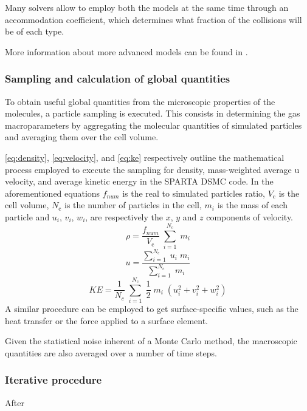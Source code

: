 Many solvers allow to employ both the models at the same time through an accommodation coefficient, which determines what fraction of the collisions will be of each type.

More information about more advanced models can be found in \cite{spartadoc}.

\subsubsection{Sampling and calculation of global quantities}
\label{subsection:sampling}

To obtain useful global quantities from the microscopic properties of the molecules, a particle sampling is executed. This consists in determining the gas macroparameters by aggregating the molecular quantities of simulated particles and averaging them over the cell volume. 

\autoref{eq:density}, \autoref{eq:velocity}, and \autoref{eq:ke} respectively outline the mathematical process employed to execute the sampling for density, mass-weighted average u velocity, and average kinetic energy in the SPARTA DSMC code. In the aforementioned equations $f_{num}$ is the real to simulated particles ratio, $V_{\mathrm{c}}$ is the cell volume, $N_{\mathrm{c}}$ is the number of particles in the cell, $m_i$ is the mass of each particle and $u_i$, $v_i$, $w_i$, are respectively the $x$, $y$ and $z$ components of velocity.
\begin{equation}
    \rho = \frac{f_{num}}{V_{\mathrm{c}}}\; \sum_{i=1}^{N_{\mathrm{c}}}\; m_i
    \label{eq:density}
\end{equation}
\begin{equation}
    u = \frac{\sum_{i=1}^{N_{\mathrm{c}}}\; u_i\; m_i}{\sum_{i=1}^{N_{\mathrm{c}}}\; m_i} 
    \label{eq:velocity}
\end{equation}
\begin{equation}
    KE = \frac{1}{N_c}\; \sum_{i=1}^{N_{\mathrm{c}}}\; \frac{1}{2}\; m_i\; (u_i^2+v_i^2+w_i^2)
    \label{eq:ke}
\end{equation}
A similar procedure can be employed to get surface-specific values, such as the heat transfer or the force applied to a surface element.

Given the statistical noise inherent of a Monte Carlo method, the macroscopic quantities are also averaged over a number of time steps.

\subsubsection{Iterative procedure}
After 

